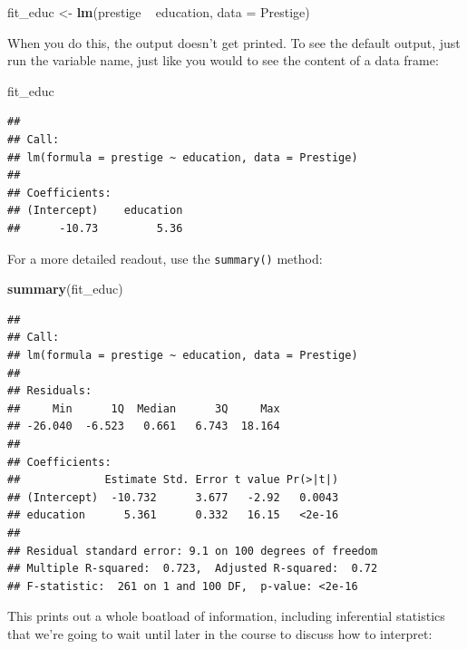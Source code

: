 \documentclass[12pt,oneside,openany]{book}
\newenvironment{Shaded}{\begin{snugshade}}{\end{snugshade}}
\newcommand{\KeywordTok}[1]{\textcolor[rgb]{0.13,0.29,0.53}{\textbf{{#1}}}}
\newcommand{\DataTypeTok}[1]{\textcolor[rgb]{0.13,0.29,0.53}{{#1}}}
\newcommand{\StringTok}[1]{\textcolor[rgb]{0.31,0.60,0.02}{{#1}}}
\newcommand{\NormalTok}[1]{{#1}}
\begin{document}
\begin{Shaded}
\begin{Highlighting}[]
\NormalTok{fit_educ <-}\StringTok{ }\KeywordTok{lm}\NormalTok{(prestige ~}\StringTok{ }\NormalTok{education, }\DataTypeTok{data =} \NormalTok{Prestige)}
\end{Highlighting}
\end{Shaded}

When you do this, the output doesn't get printed. To see the default
output, just run the variable name, just like you would to see the
content of a data frame:

\begin{Shaded}
\begin{Highlighting}[]
\NormalTok{fit_educ}
\end{Highlighting}
\end{Shaded}

\begin{verbatim}
## 
## Call:
## lm(formula = prestige ~ education, data = Prestige)
## 
## Coefficients:
## (Intercept)    education  
##      -10.73         5.36
\end{verbatim}

For a more detailed readout, use the \texttt{summary()} method:

\begin{Shaded}
\begin{Highlighting}[]
\KeywordTok{summary}\NormalTok{(fit_educ)}
\end{Highlighting}
\end{Shaded}

\begin{verbatim}
## 
## Call:
## lm(formula = prestige ~ education, data = Prestige)
## 
## Residuals:
##     Min      1Q  Median      3Q     Max 
## -26.040  -6.523   0.661   6.743  18.164 
## 
## Coefficients:
##             Estimate Std. Error t value Pr(>|t|)
## (Intercept)  -10.732      3.677   -2.92   0.0043
## education      5.361      0.332   16.15   <2e-16
## 
## Residual standard error: 9.1 on 100 degrees of freedom
## Multiple R-squared:  0.723,  Adjusted R-squared:  0.72 
## F-statistic:  261 on 1 and 100 DF,  p-value: <2e-16
\end{verbatim}

This prints out a whole boatload of information, including inferential
statistics that we're going to wait until later in the course to discuss
how to interpret:
\end{document}
